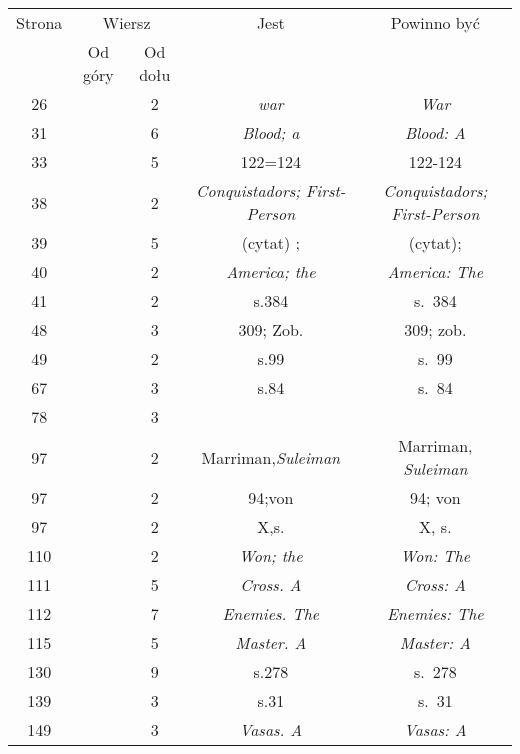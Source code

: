 \documentclass[a4paper,11pt]{article}
\numberwithin{equation}{section}
\begin{document}
\begin{center}

  \begin{tabular}{|c|c|c|c|c|}
    \hline
    Strona & \multicolumn{2}{c|}{Wiersz} & Jest
                              & Powinno być \\ \cline{2-3}
    & Od góry & Od dołu & & \\
    \hline
    \hphantom{0}26 & & \hphantom{0}2 & \textit{war} & \textit{War} \\
    \hphantom{0}31 & & \hphantom{0}6 & \textit{Blood; a}
    & \textit{Blood: A} \\
    \hphantom{0}33 & & \hphantom{0}5 & 122=124 & 122-124 \\
    \hphantom{0}38 & & \hphantom{0}2 & \textit{Conquistadors; First-Person}
    & \textit{Conquistadors; First-Person} \\
    \hphantom{0}39 & & \hphantom{0}5 & (cytat) ; & (cytat); \\
    \hphantom{0}40 & & \hphantom{0}2 & \textit{America; the}
    & \textit{America: The} \\
    \hphantom{0}41 & & \hphantom{0}2 & s.384 & s.~384 \\
    \hphantom{0}48 & & \hphantom{0}3 & 309; Zob. & 309; zob. \\
    \hphantom{0}49 & & \hphantom{0}2 & s.99 & s.~99 \\
    \hphantom{0}67 & & \hphantom{0}3 & s.84 & s.~84 \\
    \hphantom{0}78 & & \hphantom{0}3 & & \\
    \hphantom{0}97 & & \hphantom{0}2 & Marriman,\textit{Suleiman}
    & Marriman, \textit{Suleiman} \\
    \hphantom{0}97 & & \hphantom{0}2 & 94;von & 94; von\\
    \hphantom{0}97 & & \hphantom{0}2 & X,s.& X, s. \\
    110 & & \hphantom{0}2 & \textit{Won; the} & \textit{Won: The} \\
    111 & & \hphantom{0}5 & \textit{Cross. A} & \textit{Cross: A} \\
    112 & & \hphantom{0}7 & \textit{Enemies. The} & \textit{Enemies: The} \\
    115 & & \hphantom{0}5 & \textit{Master. A} & \textit{Master: A} \\
    130 & & \hphantom{0}9 & s.278 & s.~278 \\
    139 & & \hphantom{0}3 & s.31 & s.~31 \\
    149 & & \hphantom{0}3 & \textit{Vasas. A} & \textit{Vasas: A} \\

\end{tabular}
\end{center}
\end{document}
